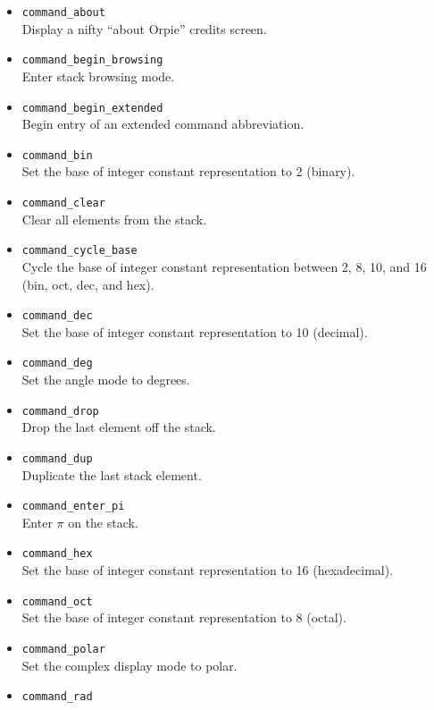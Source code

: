 \documentclass[11pt,notitlepage]{article}
\begin{document}
\begin{itemize}
   \item {\tt command\_about} \\
      Display a nifty ``about Orpie'' credits screen.
   \item {\tt command\_begin\_browsing} \\
      Enter stack browsing mode.
   \item {\tt command\_begin\_extended} \\
      Begin entry of an extended command abbreviation.
   \item {\tt command\_bin} \\
      Set the base of integer constant representation to 2 (binary).
   \item {\tt command\_clear} \\
      Clear all elements from the stack.
   \item {\tt command\_cycle\_base} \\
      Cycle the base of integer constant representation between 2, 8,
      10, and 16 (bin, oct, dec, and hex).
   \item {\tt command\_dec} \\
      Set the base of integer constant representation to 10 (decimal).
   \item {\tt command\_deg} \\
      Set the angle mode to degrees.
   \item {\tt command\_drop} \\
      Drop the last element off the stack.
   \item {\tt command\_dup} \\
      Duplicate the last stack element.
   \item {\tt command\_enter\_pi} \\
      Enter $\pi$ on the stack.
   \item {\tt command\_hex} \\
      Set the base of integer constant representation to 16 (hexadecimal).
   \item {\tt command\_oct} \\
      Set the base of integer constant representation to 8 (octal).
   \item {\tt command\_polar} \\
      Set the complex display mode to polar.
   \item {\tt command\_rad} \\

\end{itemize}
\end{document}
